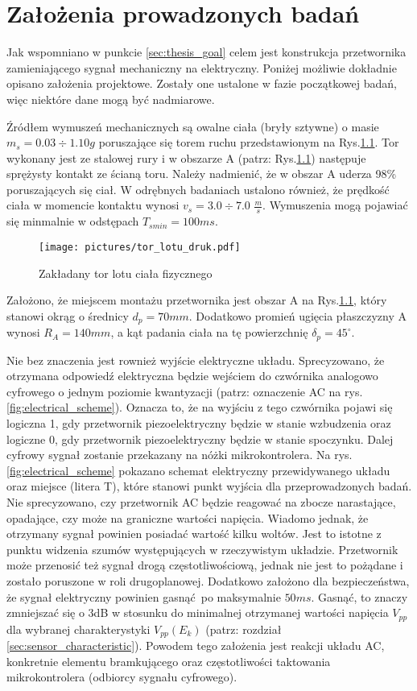 \chapter{Założenia prowadzonych badań}
\label{sec:assumptions}

Jak wspomniano w punkcie \ref{sec:thesis_goal} celem jest konstrukcja przetwornika 
zamieniającego sygnał mechaniczny na elektryczny. Poniżej możliwie dokładnie opisano 
założenia projektowe. Zostały one ustalone w fazie początkowej badań, więc niektóre
dane mogą być nadmiarowe. 

Źródłem wymuszeń mechanicznych są owalne ciała (bryły sztywne) o masie $m_s=0.03\div1.10 g$ 
poruszające się torem ruchu przedstawionym na Rys.\ref{fig:route}. 
Tor wykonany jest ze stalowej rury i w obszarze A (patrz: Rys.\ref{fig:route}) 
następuje sprężysty kontakt ze ścianą toru. Należy nadmienić, że w obszar A uderza 98\% 
poruszających się ciał. W odrębnych badaniach ustalono również, że prędkość ciała 
w momencie kontaktu wynosi $v_s=3.0\div7.0$ $\frac{m}{s}$. Wymuszenia mogą pojawiać 
się minmalnie w odstępach $T_{smin}= 100 ms$.

\begin{figure}[htbp]
\centering
\texttt{[image: pictures/tor\_lotu\_druk.pdf]}
\caption{Zakładany tor lotu ciała fizycznego}
\label{fig:route}
\end{figure}

Założono, że miejscem montażu przetwornika jest obszar A na Rys.\ref{fig:route}, który 
stanowi okrąg o średnicy $d_p=70 mm$. Dodatkowo promień ugięcia płaszczyzny A wynosi 
$R_A=140 mm$, a kąt padania ciała na tę powierzchnię $\delta_p=45^{\circ}$. 

\indent Nie bez znaczenia jest rownież wyjście elektryczne układu. Sprecyzowano, że 
otrzymana odpowiedź elektryczna będzie wejściem do czwórnika analogowo cyfrowego o jednym
poziomie kwantyzacji (patrz: oznaczenie AC na rys.\ref{fig:electrical_scheme}). 
Oznacza to, że na wyjściu z tego czwórnika pojawi się logiczna 1, gdy
przetwornik piezoelektryczny będzie w stanie wzbudzenia oraz logiczne 0, gdy przetwornik
piezoelektryczny będzie w stanie spoczynku. Dalej cyfrowy sygnał zostanie przekazany na 
nóżki mikrokontrolera. Na rys.\ref{fig:electrical_scheme} pokazano schemat elektryczny 
przewidywanego układu oraz miejsce (litera T), które stanowi punkt wyjścia dla 
przeprowadzonych badań. Nie sprecyzowano, czy przetwornik AC będzie reagować na zbocze
narastające, opadające, czy może na graniczne wartości napięcia. Wiadomo jednak, że
otrzymany sygnał powinien posiadać wartość kilku woltów. Jest to istotne z punktu widzenia
szumów występujących w rzeczywistym układzie. Przetwornik może przenosić też sygnał drogą
częstotliwościową, jednak nie jest to pożądane i zostało poruszone w roli drugoplanowej.
Dodatkowo założono dla bezpieczeństwa, że sygnał elektryczny powinien gasnąć po 
maksymalnie $50 ms$. Gasnąć, to znaczy zmniejszać się o 3dB w stosunku do minimalnej 
otrzymanej wartości napięcia $V_{pp}$ dla wybranej charakterystyki $V_{pp}(E_k)$ (patrz:
rozdział \ref{sec:sensor_characteristic}). Powodem tego założenia jest reakcji układu
AC, konkretnie elementu bramkującego oraz częstotliwości taktowania mikrokontrolera 
(odbiorcy sygnału cyfrowego).

